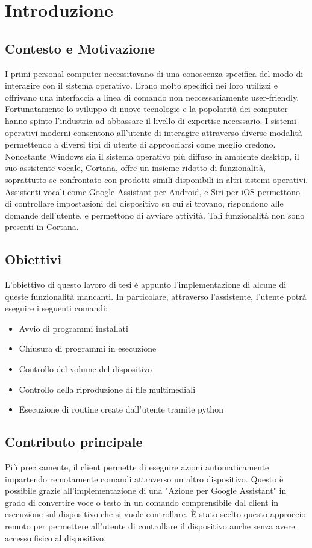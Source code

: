 \chapter{Introduzione}
\section{Contesto e Motivazione}
I primi personal computer necessitavano di una conoscenza specifica del modo di interagire con il sistema operativo.
Erano molto specifici nei loro utilizzi e offrivano una interfaccia a linea di comando non neccessariamente user-friendly.
Fortunatamente lo sviluppo di nuove tecnologie e la popolarità dei computer hanno spinto l'industria ad abbassare il livello di expertise necessario.
I sistemi operativi moderni consentono all'utente di interagire attraverso diverse modalità permettendo a diversi tipi di utente di approcciarsi come meglio credono.
Nonostante Windows sia il sistema operativo più diffuso in ambiente desktop, il suo assistente vocale, Cortana, offre un insieme ridotto di funzionalità, soprattutto se confrontato con prodotti simili disponibili in altri sistemi operativi.
Assistenti vocali come Google Assistant per Android, e Siri per iOS permettono di controllare impostazioni del dispositivo su cui si trovano, rispondono alle domande dell'utente, e permettono di avviare attività. Tali funzionalità non sono presenti in Cortana.

\section{Obiettivi}
L'obiettivo di questo lavoro di tesi è appunto l'implementazione di alcune di queste funzionalità mancanti. In particolare, attraverso l'assistente, l'utente potrà eseguire i seguenti comandi:

\begin{itemize}
    \item Avvio di programmi installati
    \item Chiusura di programmi in esecuzione
    \item Controllo del volume del dispositivo
    \item Controllo della riproduzione di file multimediali
    \item Esecuzione di routine create dall'utente tramite python
\end{itemize}

\section{Contributo principale}
Più precisamente, il client permette di eseguire azioni automaticamente impartendo remotamente comandi attraverso un altro dispositivo.
Questo è possibile grazie all'implementazione di una "Azione per Google Assistant" in grado di convertire voce o testo in un comando comprensibile dal client in esecuzione sul dispositivo che si vuole controllare.
È stato scelto questo approccio remoto per permettere all'utente di controllare il dispositivo anche senza avere accesso fisico al dispositivo.


